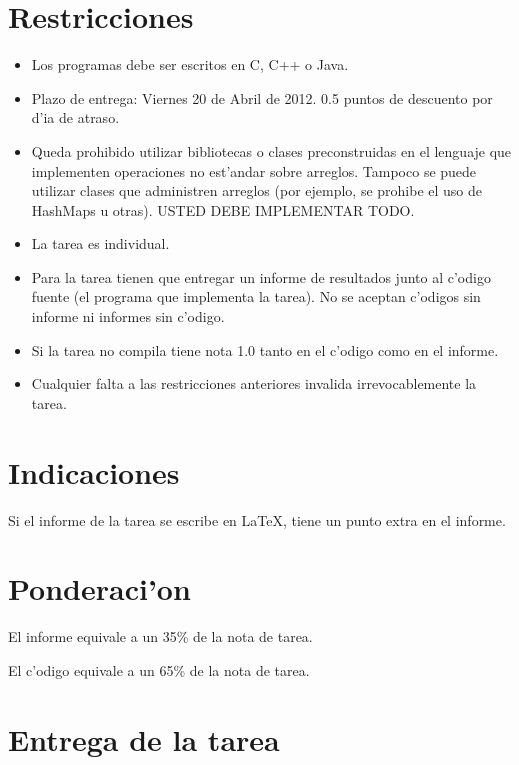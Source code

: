 \label{•} \documentclass[11pt]{utalcaDoc}
\begin{document}


\section{Restricciones}

\begin{itemize}
\item Los programas debe ser escritos en C, C++ o Java.
\item Plazo de entrega: Viernes 20 de Abril de 2012. 0.5 puntos de descuento por d'ia de atraso.
\item Queda prohibido utilizar bibliotecas o clases preconstruidas en el lenguaje
    que implementen operaciones no est'andar sobre arreglos. Tampoco se puede
    utilizar clases que administren arreglos (por ejemplo, se prohibe el uso de HashMaps
    u otras). USTED DEBE IMPLEMENTAR TODO.
\item La tarea es individual.
\item Para la tarea tienen que entregar un informe de resultados junto al c'odigo
    fuente (el programa que implementa la tarea). No se aceptan c'odigos sin
    informe ni informes sin c'odigo.
\item Si la tarea no compila tiene nota 1.0 tanto en el c'odigo como en el informe.
\item Cualquier falta a las restricciones anteriores invalida irrevocablemente
la tarea.
\end{itemize}


\section{Indicaciones}


Si el informe de la tarea se escribe en \LaTeX, tiene un punto extra
en el informe.


\section{Ponderaci'on}

El informe equivale a un 35\% de la nota de tarea.
    
El c'odigo equivale a un 65\% de la nota de tarea.


\section{Entrega de la tarea}
\end{document}
